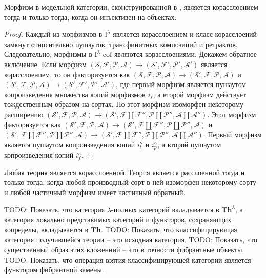 \documentclass[reqno]{amsart}
\theoremstyle{definition}
\theoremstyle{remark}
\newcommand{\bcat}[1]{\mathbf{#1}}
\newcommand{\Th}{\bcat{Th}}
\newcommand{\I}{\mathrm{I}}
\newcommand{\class}[2]{#1\text{-}\mathrm{#2}}
\newcommand{\Icof}[1][\I]{\class{#1}{cof}}
\begin{document}
\begin{prop}
Морфизм в модельной категории, сконструированной в , является корасслоением тогда и только тогда, когда он инъективен на объектах.
\end{prop}
\begin{proof}
Каждый из морфизмов в $\I^\lambda$ является корасслоением и класс корасслоений замкнут относительно пушаутов, трансфинитных композиций и ретрактов.
Следовательно, морфизмы в $\Icof[\I^\lambda]$ являются корасслоениями.
Докажем обратное включение.
Если морфизм $(\mathcal{S},\mathcal{F},\mathcal{P},\mathcal{A}) \to (\mathcal{S}',\mathcal{F}',\mathcal{P}',\mathcal{A}')$ является корасслоением,
то он факторизуется как $(\mathcal{S},\mathcal{F},\mathcal{P},\mathcal{A}) \to (\mathcal{S}',\mathcal{F},\mathcal{P},\mathcal{A})$ и $(\mathcal{S}',\mathcal{F},\mathcal{P},\mathcal{A}) \to (\mathcal{S}',\mathcal{F}',\mathcal{P}',\mathcal{A}')$,
где первый морфизм является пушаутом копроизведения множества копий морфизмов $i_s$, а второй морфизм действует тождественным образом на сортах.
По  этот морфизм изоморфен некоторому расширению $(\mathcal{S}',\mathcal{F},\mathcal{P},\mathcal{A}) \to (\mathcal{S}', \mathcal{F} \amalg \mathcal{F}'', \mathcal{P} \amalg \mathcal{P}'', \mathcal{A} \amalg \mathcal{A}'')$.
Этот морфизм факторизуется как $(\mathcal{S}',\mathcal{F},\mathcal{P},\mathcal{A}) \to (\mathcal{S}', \mathcal{F} \amalg \mathcal{F}'', \mathcal{P} \amalg \mathcal{P}'', \mathcal{A})$ и
$(\mathcal{S}', \mathcal{F} \amalg \mathcal{F}'', \mathcal{P} \amalg \mathcal{P}'', \mathcal{A}) \to (\mathcal{S}', \mathcal{F} \amalg \mathcal{F}'', \mathcal{P} \amalg \mathcal{P}'', \mathcal{A} \amalg \mathcal{A}'')$.
Первый морфизм является пушаутом копроизведения копий $i_t^\kappa$ и $i_p^\kappa$, а второй пушаутом копроизведения копий $i_f^\kappa$.
\end{proof}

\begin{remark}
Любая теория является корасслоенной.
Теория является расслоенной тогда и только тогда, когда любой производный сорт в ней изоморфен некоторому сорту и любой частичный морфизм имеет частичный обратный.
\end{remark}

TODO: Показать, что категория $\lambda$-полных категорий вкладывается в $\Th^\lambda$, а категория локально представимых категорий и функторов, сохраняющих копределы, вкладывается в $\Th$.
TODO: Показать, что классифицирующая категория получившейся теории -- это исходная категория.
TODO: Показать, что существенный образ этих вложенний -- это в точности фибрантные объекты.
TODO: Показать, что операция взятия классифицирующей категории является функтором фибрантной замены.
\end{document}
